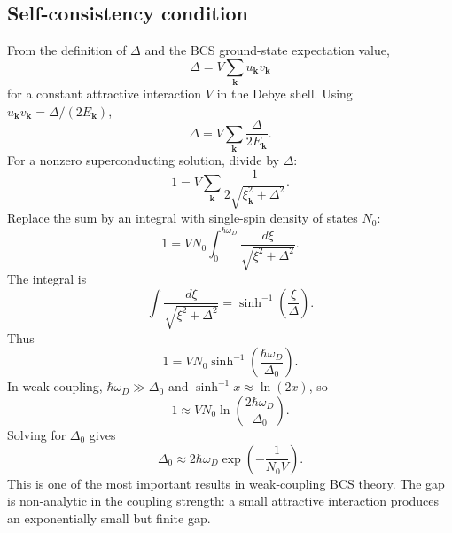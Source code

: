 \documentclass[11pt]{article}
\newcommand{\bk}{{\bm{k}}}
\begin{document}
\subsection{Self-consistency condition}
From the definition of $\Delta$ and the BCS ground-state expectation value,
\begin{equation}
\Delta=V\sum_{\bk}u_\bk v_\bk
\end{equation}
for a constant attractive interaction $V$ in the Debye shell. Using $u_\bk v_\bk=\Delta/(2E_\bk)$,
\begin{equation}
\Delta=V\sum_{\bk}\frac{\Delta}{2E_\bk}.
\end{equation}
For a nonzero superconducting solution, divide by $\Delta$:
\begin{equation}
1=V\sum_{\bk}\frac{1}{2\sqrt{\xi_\bk^2+\Delta^2}}.
\end{equation}
Replace the sum by an integral with single-spin density of states $N_0$:
\begin{equation}
1=V N_0\int_0^{\hbar\omega_D}\frac{d\xi}{\sqrt{\xi^2+\Delta^2}}.
\end{equation}
The integral is
\begin{equation}
\int\frac{d\xi}{\sqrt{\xi^2+\Delta^2}}=\sinh^{-1}\left(\frac{\xi}{\Delta}\right).
\end{equation}
Thus
\begin{equation}
1=V N_0\sinh^{-1}\left(\frac{\hbar\omega_D}{\Delta_0}\right).
\end{equation}
In weak coupling, $\hbar\omega_D\gg\Delta_0$ and $\sinh^{-1}x\approx\ln(2x)$, so
\begin{equation}
1\approx V N_0\ln\left(\frac{2\hbar\omega_D}{\Delta_0}\right).
\end{equation}
Solving for $\Delta_0$ gives
\begin{equation}
\Delta_0\approx2\hbar\omega_D\exp\left(-\frac{1}{N_0V}\right).
\label{eq:delta0_weak}
\end{equation}
This is one of the most important results in weak-coupling BCS theory. The gap is non-analytic in the coupling strength: a small attractive interaction produces an exponentially small but finite gap.
\end{document}
